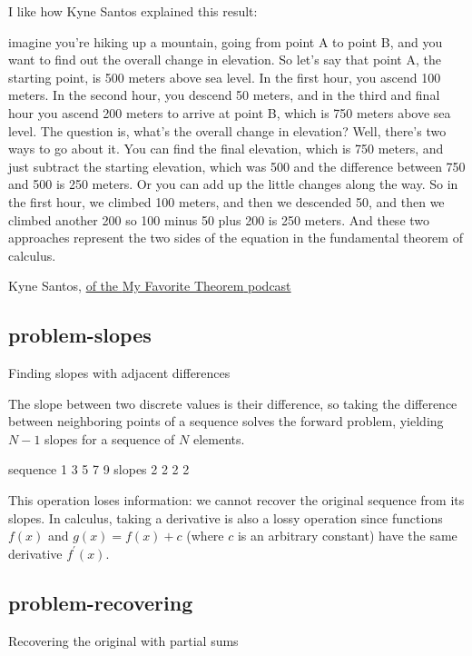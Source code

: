 \documentclass{article}
\begin{document}
I like how Kyne Santos explained this result:

\epigraph{
imagine you're hiking up a mountain, going from point A to point B, and you want to find out the overall change in elevation.
So let's say that point A, the starting point, is 500 meters above sea level.
In the first hour, you ascend 100 meters.
In the second hour, you descend 50 meters, and in the third and final hour you ascend 200 meters to arrive at point B, which is 750 meters above sea level.
The question is, what's the overall change in elevation? Well, there's two ways to go about it.
You can find the final elevation, which is 750 meters, and just subtract the starting elevation, which was 500 and the difference between 750 and 500 is 250 meters.
Or you can add up the little changes along the way.
So in the first hour, we climbed 100 meters, and then we descended 50, and then we climbed another 200 so 100 minus 50 plus 200 is 250 meters.
And these two approaches represent the two sides of the equation in the fundamental theorem of calculus.
}{Kyne Santos, \href{https://kpknudson.com/my-favorite-theorem/2025/5/15/episode-95-kyne-santos}{\cite{episode 95} of the \href{https://kpknudson.com/my-favorite-theorem}{My Favorite Theorem} podcast}}

\subsection{problem-slopes}{Finding slopes with adjacent differences}

The slope between two discrete values is their difference,
so taking the difference between neighboring points of a sequence solves the forward problem,
yielding $N-1$ slopes for a sequence of $N$ elements.

\begin{code}
sequence  1  3  5  7  9
  slopes  2  2  2  2
\end{code}

This operation loses information:
we cannot recover the original sequence from its slopes.
In calculus, taking a derivative is also a lossy operation since functions
$f(x)$ and $g(x) = f(x) + c$
(where $c$ is an arbitrary constant) have the same derivative $f^\prime(x)$.

\subsection{problem-recovering}{Recovering the original with partial sums}
\end{document}
